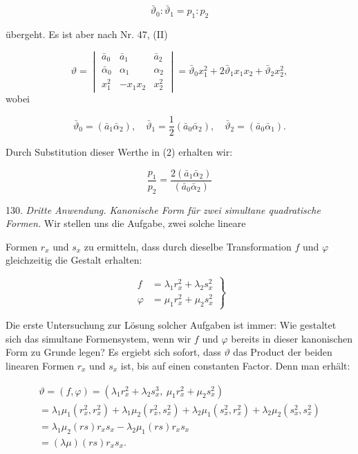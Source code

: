 \documentclass[11pt]{article}
\providecommand{\weberpage}[1]{}
\providecommand{\weq}[2]{\begin{equation}\tag{#1}#2\end{equation}}
\begin{document}
\weq{2}{\bar\vartheta_0 : \bar\vartheta_1 = p_1 : p_2}

übergeht. Es ist aber nach Nr. 47, (II)

\[
\vartheta = \begin{vmatrix} \bar a_0 & \bar a_1 & \bar a_2 \\ \bar\alpha_0 & \alpha_1 & \alpha_2 \\ x_1^2 & -x_1x_2 & x_2^2 \end{vmatrix} = \bar\vartheta_0 x_1^2 + 2\bar\vartheta_1 x_1x_2 + \bar\vartheta_2 x_2^2,
\]
wobei

\[
\bar\vartheta_0 = (\bar a_1\bar\alpha_2), \quad \bar\vartheta_1 = \frac{1}{2}(\bar a_0\bar\alpha_2), \quad \bar\vartheta_2=(\bar a_0\bar\alpha_1).
\]

Durch Substitution dieser Werthe in (2) erhalten wir:

\weq{3}{\frac{p_1}{p_2} = \frac{2(\bar a_1\bar\alpha_2)}{(\bar a_0\bar\alpha_2)}}

130. \textit{Dritte Anwendung. Kanonische Form für zwei simultane
quadratische Formen.} Wir stellen uns die Aufgabe, zwei solche lineare


\weberpage{146}
Formen $r_x$ und $s_x$ zu ermitteln, dass durch dieselbe Transformation $f$ und
$\varphi$ gleichzeitig die Gestalt erhalten:

\weq{I}{\left.\begin{aligned} f &= \lambda_1 r_x^2 + \lambda_2 s_x^2\\ \varphi &= \mu_1 r_x^2 + \mu_2 s_x^2\end{aligned}\right\}}

Die erste Untersuchung zur Lösung solcher Aufgaben ist immer: Wie gestaltet sich
das simultane Formensystem, wenn wir $f$ und $\varphi$ bereits in dieser kanonischen
Form zu Grunde legen? Es ergiebt sich sofort, dass $\vartheta$ das Product der beiden
linearen Formen $r_x$ und $s_x$ ist, bis auf einen constanten Factor. Denn man erhält:

\[
\begin{gathered}
\vartheta = (f,\varphi) = (\lambda_1 r_x^2 + \lambda_2 s_x^3,\ \mu_1 r_x^2 + \mu_2 s_x^2) %
\\
= \lambda_1\mu_1(r_x^2,r_x^2) + \lambda_1\mu_2(r_x^2,s_x^2) + \lambda_2\mu_1(s_x^2,r_x^2) + \lambda_2\mu_2(s_x^2,s_x^2)
\\
= \lambda_1\mu_2(rs)r_xs_x - \lambda_2\mu_1(rs)r_xs_x
\\
= (\lambda\mu)(rs)r_xs_x.
\end{gathered}
\]
\end{document}
